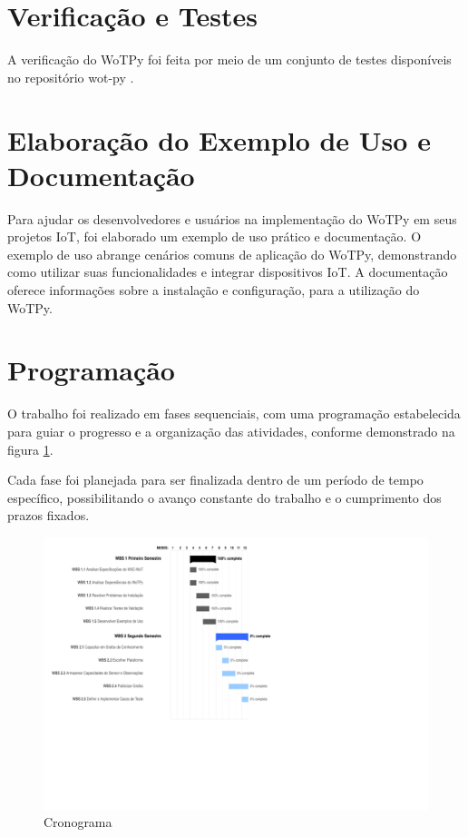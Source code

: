 \section{Verificação e Testes}

A verificação do WoTPy foi feita por meio de um conjunto de testes disponíveis no repositório wot-py .

\section{Elaboração do Exemplo de Uso e Documentação}

Para ajudar os desenvolvedores e usuários na implementação do WoTPy em seus projetos IoT, foi elaborado um exemplo de uso prático e documentação. O exemplo de uso abrange cenários comuns de aplicação do WoTPy, demonstrando como utilizar suas funcionalidades e integrar dispositivos IoT. A documentação oferece informações sobre a instalação e configuração, para a utilização do WoTPy.

\section{Programação}

O trabalho foi realizado em fases sequenciais, com uma programação estabelecida para guiar o progresso e a organização das atividades, conforme demonstrado na figura \ref{fig:cronograma}.

Cada fase foi planejada para ser finalizada dentro de um período de tempo específico, possibilitando o avanço constante do trabalho e o cumprimento dos prazos fixados.

\begin{figure}
    \caption{Cronograma}
    \label{fig:cronograma}
    \includegraphics[trim={0.5cm 2.5cm 0 0 },clip]{figs/Cronograma_Ariga.pdf}
\end{figure}


